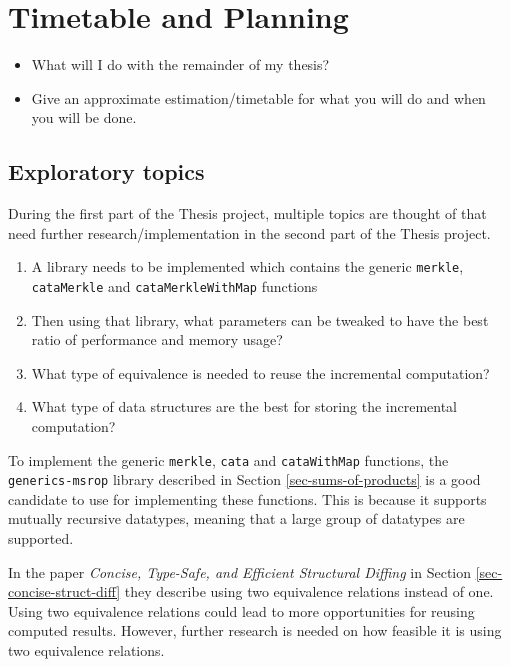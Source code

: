 \section{Timetable and Planning}
\begin{itemize}
    \item What will I do with the remainder of my thesis?
    \item Give an approximate estimation/timetable for what you will do and when you will be done.    
\end{itemize}

\subsection{Exploratory topics}
During the first part of the Thesis project, multiple topics are thought of that need further research/implementation in the second part of the Thesis project.
\begin{enumerate}[label={(\Alph*)}]
    \item A library needs to be implemented which contains the generic \texttt{merkle}, \texttt{cataMerkle} and \texttt{cataMerkleWithMap} functions
    \item Then using that library, what parameters can be tweaked to have the best ratio of performance and memory usage?
    \item What type of equivalence is needed to reuse the incremental computation?
    \item What type of data structures are the best for storing the incremental computation?
\end{enumerate}

To implement the generic \texttt{merkle}, \texttt{cata} and \texttt{cataWithMap} functions, the \texttt{generics-msrop} library described in Section \ref{sec-sums-of-products} is a good candidate to use for implementing these functions. This is because it supports mutually recursive datatypes, meaning that a large group of datatypes are supported. 


In the paper \textit{Concise, Type-Safe, and Efficient Structural Diffing} in Section \ref{sec-concise-struct-diff} they describe using two equivalence relations instead of one. Using two equivalence relations could lead to more opportunities for reusing computed results. However, further research is needed on how feasible it is using two equivalence relations. 

